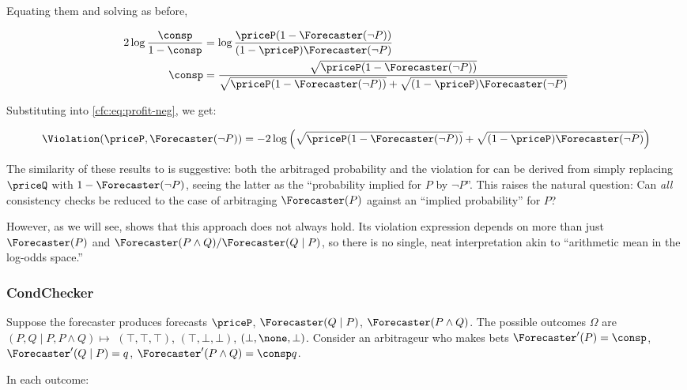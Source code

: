 Equating them and solving as before,

\begin{align*}
    2\log\frac{\consp}{1-\consp} &=
    \log\frac{\priceP(1-\pricenotP)}{(1-\priceP)\pricenotP} \\
    \consp &=
    \frac{\sqrt{\priceP(1-\pricenotP)}}{\sqrt{\priceP(1-\pricenotP)}+\sqrt{(1-\priceP)\pricenotP}} \\
\end{align*}

Substituting into \eqref{cfc:eq:profit-neg}, we get:

\begin{equation}
    \Violation(\priceP,\pricenotP)=-2\log\left(\sqrt{\priceP(1-\pricenotP)}+\sqrt{(1-\priceP)\pricenotP}\right)
\end{equation}

The similarity of these results to \ParaphraseChecker{} is suggestive: both the arbitraged probability and the violation for \NegChecker{} can be derived from \ParaphraseChecker{} simply replacing $\priceQ$ with $1-\pricenotP$, seeing the latter as the ``probability implied for $P$ by $\lnot P$''.
This raises the natural question: Can \emph{all} consistency checks be reduced to the case of \ParaphraseChecker{} arbitraging $\Forecaster(P)$ against an ``implied probability'' for $P$?

However, as we will see, \CondChecker{} shows that this approach does not always hold. Its violation expression depends on more than just $\Forecaster(P)$ and $\Forecaster(P\land Q)/\Forecaster(Q\mid P)$, so there is no single, neat interpretation akin to ``arithmetic mean in the log-odds space.''

\subsubsection{CondChecker}
\label{cfc:sec:arbitrage-cond}


Suppose the forecaster produces forecasts $\priceP$, $\priceQgivenP$, $\pricePandQ$. The possible outcomes $\Omega$ are $(P,Q\mid P,P\land Q)\mapsto$ $(\top,\top,\top)$, $(\top,\bot,\bot)$, $(\bot,\none,\bot)$. Consider an arbitrageur who makes bets $\Forecaster'(P)=\consp$, $\Forecaster'(Q\mid P)=\consq$, $\Forecaster'(P\land Q)=\consp\consq$.

In each outcome:

